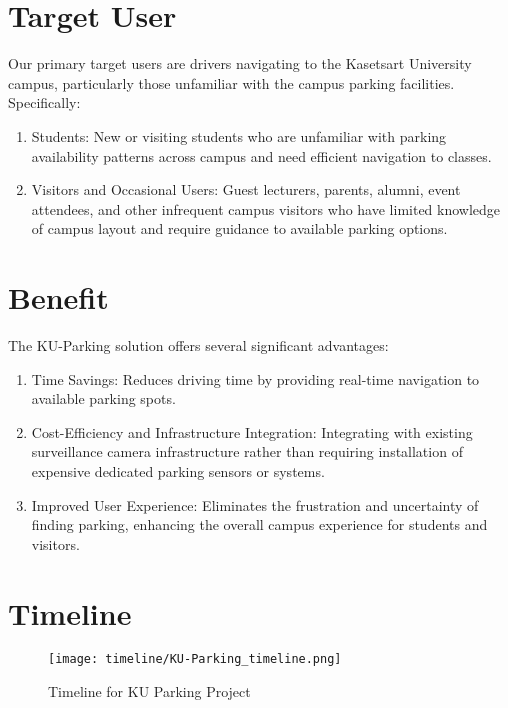 \section{Target User}
\label{section:target-user}

Our primary target users are drivers navigating to the Kasetsart University campus, particularly those unfamiliar with the campus parking facilities. Specifically:
\begin{enumerate}[leftmargin=80pt]
\item Students: New or visiting students who are unfamiliar with parking availability patterns across campus and need efficient navigation to classes.
\item Visitors and Occasional Users: Guest lecturers, parents, alumni, event attendees, and other infrequent campus visitors who have limited knowledge of campus layout and require guidance to available parking options.
\end{enumerate}


\section{Benefit}
\label{section:benefit}

The KU-Parking solution offers several significant advantages:

\begin{enumerate}[leftmargin=80pt]
    \item Time Savings: Reduces driving time by providing real-time navigation to available parking spots.
    
    \item Cost-Efficiency and Infrastructure Integration: Integrating with existing surveillance camera infrastructure rather than requiring installation of expensive dedicated parking sensors or systems.
    
    \item Improved User Experience: Eliminates the frustration and uncertainty of finding parking, enhancing the overall campus experience for students and visitors.
\end{enumerate}

\section{Timeline}
\label{section:timeline}

\begin{figure}[h!]
    \centering
    \texttt{[image: timeline/KU-Parking\_timeline.png]}
    \caption{Timeline for KU Parking Project}
    \label{fig:timeline}
\end{figure}


